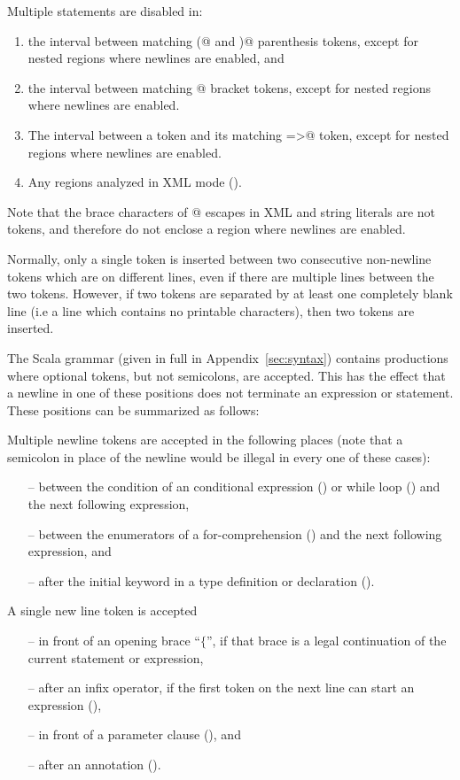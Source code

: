 Multiple statements are disabled in:
\begin{enumerate}
\item
the interval between matching \lstinline@(@ and \lstinline@)@ parenthesis tokens, except for nested regions where newlines are enabled, and
\item
the interval between matching @ bracket tokens,
except for nested regions where newlines are enabled.
\item
The interval between a \lstinline@case@ token and its matching
\lstinline@=>@ token, except for nested regions where newlines are
enabled.
\item Any regions analyzed in XML mode ().
\end{enumerate}
Note that the brace characters of @ escapes in XML and
string literals are not tokens, 
and therefore do not enclose a region where newlines
are enabled.

Normally, only a single  token is inserted between two
consecutive non-newline tokens which are on different lines, even if there are multiple lines
between the two tokens. However, if two tokens are separated by at
least one completely blank line (i.e a line which contains no
printable characters), then two  tokens are inserted.

The Scala grammar (given in full in Appendix~\ref{sec:syntax})
contains productions where optional  tokens, but not
semicolons, are accepted. This has the effect that a newline in one of these
positions does not terminate an expression or statement. These positions can
be summarized as follows:

Multiple newline tokens are accepted in the following places (note
that a semicolon in place of the newline would be illegal in every one
of these cases):
\begin{itemize}
\item[--]
between the condition of an conditional expression
() or while loop () and the next
following expression,
\item[--]
between the enumerators of a for-comprehension ()
and the next following expression, and
\item[--]
after the initial \lstinline@type@ keyword in a type definition or
declaration ().
\end{itemize}
A single new line token is accepted
\begin{itemize}
\item[--] 
  in front of an opening brace ``$\{$'', if that brace is a legal
  continuation of the current statement or expression,
\item[--]
  after an infix operator, if the first token on the next line can
  start an expression (),
\item[--]
  in front of a parameter clause (), and
\item[--]
  after an annotation ().
\end{itemize}  

